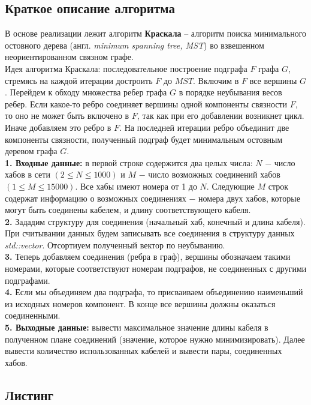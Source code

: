 \documentclass[a5paper, 10pt]{article}
\theoremstyle{definition}
\theoremstyle{plain}
\theoremstyle{remark}
\begin{document}
\subsection{Краткое описание алгоритма}
В основе реализации лежит алгоритм \textbf{Краскала} -- алгоритм поиска минимального остовного дерева (англ. \textit{minimum spanning tree, MST}) во взвешенном неориентированном связном графе.\\

Идея алгоритма Краскала: последовательное построение подграфа $F$ графа $G$, стремясь на каждой итерации достроить $F$ до $MST$. Включим в $F$ все вершины $G$. Перейдем к обходу множества ребер графа $G$ в порядке неубывания весов ребер. Если какое-то ребро соединяет вершины одной компоненты связности $F$, то оно не может быть включено в $F$, так как при его добавлении возникнет цикл. Иначе добавляем это ребро в $F$. На последней итерации ребро объединит две компоненты связности, полученный подграф будет минимальным остовным деревом графа $G$.\\


\textbf{1. Входные данные:} в первой строке содержится два целых числа: $N$ $-$ число хабов в сети $(2 \leq N \leq 1000)$ и $M$ $-$ число возможных соединений хабов $(1 \leq M \leq 15000)$. Все хабы имеют номера от 1 до $N$. Следующие $M$ строк содержат информацию о возможных соединениях $-$ номера двух хабов, которые могут быть соединены кабелем, и длину соответствующего кабеля.\\
\textbf{2.}  Зададим структуру для соединения (начальный хаб, конечный и длина кабеля). При считывании данных будем записывать все соединения в структуру данных \textit{std::vector}. Отсортиуем полученный вектор по неубыванию.\\
\textbf{3.}  Теперь добавляем соединения (ребра в граф), вершины обозначаем такими номерами, которые соответствуют номерам подграфов, не соединенных с другими подграфами.\\
\textbf{4.}  Если мы объединяем два подграфа, то присваиваем объединению наименьший из исходных номеров компонент. В конце все вершины должны оказаться соединенными.\\
\textbf{5. Выходные данные:} вывести максимальное значение длины кабеля в полученном плане соединений (значение, которое нужно минимизировать). Далее вывести количество использованных кабелей и вывести пары, соединенных хабов.

\newpage
\subsection{Листинг}
\end{document}
